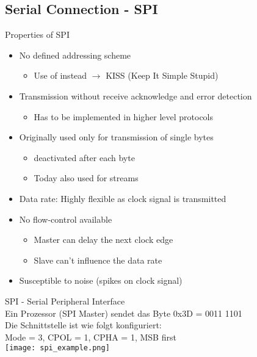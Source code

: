 \subsection{Serial Connection - SPI}

\begin{definition}{Properties of SPI}
    \begin{itemize}
        \item No defined addressing scheme
        \begin{itemize}
            \item Use of  instead $\rightarrow$ KISS (Keep It Simple Stupid)
        \end{itemize}
        \item Transmission without receive acknowledge and error detection
        \begin{itemize}
            \item Has to be implemented in higher level protocols
        \end{itemize}
        \item Originally used only for transmission of single bytes
        \begin{itemize}
            \item {} deactivated after each byte
            \item Today also used for streams 
        \end{itemize}
        \item Data rate: Highly flexible as clock signal is transmitted
        \item No flow-control available
        \begin{itemize}
            \item Master can delay the next clock edge
            \item Slave can't influence the data rate
        \end{itemize}
        \item Susceptible to noise (spikes on clock signal)
    \end{itemize}
\end{definition}

\begin{example2}{SPI - Serial Peripheral Interface}\\
    Ein Prozessor (SPI Master) sendet das Byte 0x3D = 0011 1101\\
    Die Schnittstelle ist wie folgt konfiguriert:\\
    Mode = 3, CPOL = 1, CPHA = 1, MSB first\\
    \texttt{[image: spi\_example.png]}
\end{example2}

